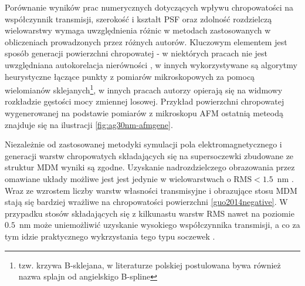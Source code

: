 Porównanie wyników prac numerycznych dotyczących wpływu chropowatości na współczynnik transmisji, szerokość i kształt PSF oraz zdolność rozdzielczą wielowarstwy wymaga uwzględnienia różnic w metodach zastosowanych w obliczeniach prowadzonych przez różnych autorów. Kluczowym elementem jest sposób generacji powierzchni chropowatej - w niektórych pracach nie jest uwzględniana autokorelacja nierówności \cite{guo2014negative}, w innych wykorzystywane są algorytmy heurystyczne łączące punkty z pomiarów mikroskopowych za pomocą wielomianów sklejanych\footnote{tzw. krzywa B-sklejana, w literaturze polskiej postulowana bywa również nazwa splajn od angielskigo B-spline}\cite{ludwig2012impact}, w innych pracach autorzy opierają się na widmowy rozkładzie gęstości mocy zmiennej losowej\cite{pastuszczak2013engineering}. Przykład powierzchni chropowatej wygenerowanej na podstawie pomiarów z mikroskopu AFM ostatnią meteodą znajduje się na ilustracji \ref{fig:ag30nm-afmgene}.

Niezależnie od zastosowanej metodyki symulacji pola elektromagnetycznego i generacji warstw chropowatych składających się na supersoczewki zbudowane ze struktur MDM wyniki są zgodne. Uzyskanie nadrozdzielczego obrazowania przez omawiane układy  możliwe jest jest jedynie w wielowarstwach o RMS$<1.5$~nm \citep{guo2014negative,stefaniuk2011effect,ludwig2012impact}. Wraz ze wzrostem liczby warstw własności transmisyjne i obrazujące stosu MDM stają się bardziej wrażliwe na chropowatości powierzchni \ref{guo2014negative}. W przypadku stosów składających się z kilkunastu warstw RMS nawet na poziomie $0.5$~nm może uniemożliwić uzyskanie wysokiego współczynnika transmisji, a co za tym idzie praktycznego wykrzystania tego typu soczewek \cite{pastuszczak2013engineering}.








